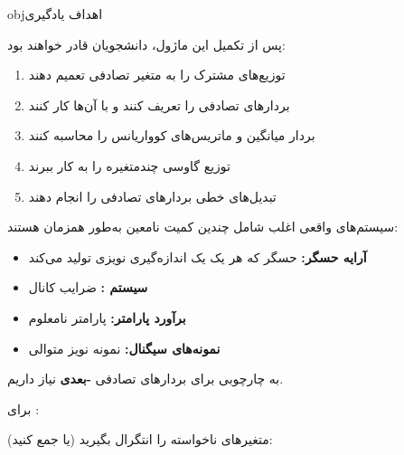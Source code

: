 \begin{PSbox}[unbreakable]{obj}{اهداف یادگیری}

پس از تکمیل این ماژول، دانشجویان قادر خواهند بود:

\begin{enumerate}
\def\labelenumi{\arabic{enumi}.}
\tightlist
\item
  توزیع‌های مشترک را به  متغیر تصادفی تعمیم دهند
\item
  بردارهای تصادفی را تعریف کنند و با آن‌ها کار کنند
\item
  بردار میانگین و ماتریس‌های کوواریانس را محاسبه کنند
\item
  توزیع گاوسی چندمتغیره را به کار ببرند
\item
  تبدیل‌های خطی بردارهای تصادفی را انجام دهند
\end{enumerate}

\end{PSbox}


سیستم‌های واقعی اغلب شامل چندین کمیت نامعین به‌طور همزمان هستند:

\begin{itemize}
\tightlist
\item
  \textbf{آرایه حسگر:}  حسگر که هر یک یک اندازه‌گیری نویزی تولید می‌کند
\item
  \textbf{سیستم :} ضرایب کانال 
\item
  \textbf{برآورد پارامتر:}  پارامتر نامعلوم
\item
  \textbf{نمونه‌های سیگنال:}  نمونه نویز متوالی
\end{itemize}

به چارچوبی برای بردارهای تصادفی \textbf{-بعدی} نیاز داریم.



برای :


متغیرهای ناخواسته را انتگرال بگیرید (یا جمع کنید):


